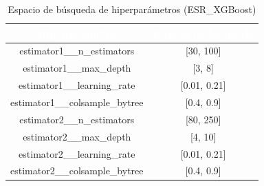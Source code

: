\begin{table}[htp]
	\centering
	\renewcommand{\arraystretch}{1.3}
		\begin{tabular}{ | c | c | }
			\hline
			\rowcolor[HTML]{5B9BD5} 
			\textcolor{white}{\textbf{Hiperparámetro}} & \textcolor{white}{\textbf{Espacio de búsqueda}}\\
			\hline
			
			estimator1\_\_n\_estimators & [30, 100] \\
			\hline
			estimator1\_\_max\_depth & [3, 8] \\
			\hline
			estimator1\_\_learning\_rate & [0.01, 0.21] \\
			\hline
			estimator1\_\_colsample\_bytree & [0.4, 0.9] \\
			\hline
			estimator2\_\_n\_estimators & [80, 250] \\
			\hline
			estimator2\_\_max\_depth & [4, 10] \\
			\hline
			estimator2\_\_learning\_rate & [0.01, 0.21] \\
			\hline
			estimator2\_\_colsample\_bytree & [0.4, 0.9] \\
			\hline
			
		\end{tabular} 
		
		\caption{Espacio de búsqueda de hiperparámetros (ESR\_XGBoost)}
		\label{table:esr_xgb_hiperparam}
	\end{table}